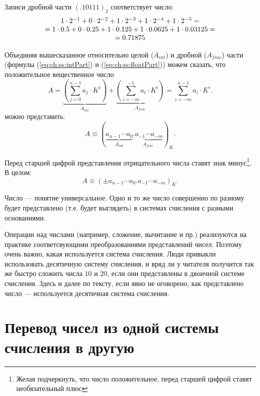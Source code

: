 \begin{exampl}
    Записи дробной части $(.10111)_{2}$  соответствует число:
    \[
        \begin{array}[c]{c}
            1\cdot 2^{-1}+
            0\cdot 2^{-2}+
            1\cdot 2^{-3}+
            1\cdot 2^{-4}+
            1\cdot 2^{-5} = \\
            =
            1\cdot 0.5+
            0\cdot 0.25+
            1\cdot 0.125+
            1\cdot 0.0625+
            1\cdot 0.03125 = \\
            = 0.71875
        \end{array}
    \]
\end{exampl}

Объединяя вышесказанное относительно целой ($A_{int}$) и дробной ($A_{frac}$) части (формулы (\ref{eq:ch:ss:intPart}) и (\ref{eq:ch:ss:floatPart})) можем сказать, что положительное вещественное число 
\[
    A=
    \underbrace{\left(\sum_{j=0}^{n-1}a_j\cdot K^{j}\right)}_{A_{int}} + 
    \underbrace{\left(\sum_{i=-m}^{-1}a_i\cdot K^{i}\right)}_{A_{frac}} =
    \sum_{i=-m}^{n-1}a_i\cdot K^{i}.
\]
можно представить:
\[
    A\equiv(\underbrace{a_{n-1}\cdots a_{0}}_{A_{int}}\underbrace{.a_{-1}\cdots a_{-m}}_{A_{frac}})_K.
\]

Перед старшей цифрой представления отрицательного числа ставят знак минус\footnote{Желая подчеркнуть, что число положительное, перед старшей цифрой ставят необязательный плюс}. В целом:
\[
    A\equiv(\pm a_{n-1}\cdots a_{0}.a_{-1}\cdots a_{-m})_K.
\]

Число --- понятие универсальное. Одно и то же число совершенно по разному будет представлено (т.е. будет выглядеть) в системах счисления с разными основаниями. 

Операции над числами (например, сложение, вычитание и пр.) реализуются на практике соответсвующими преобразованиями представлений чисел. Поэтому очень важно, какая используется система счисления. Люди привыкли использовать десятичную систему счисления, и вряд ли у читателя получится так же быстро сложить числа $10$ и $20$, если они представлены в двоичной системе счисления. Здесь и далее по тексту, если явно не оговорено, как представлено число --- используется десятичная система счисления.


\section{Перевод чисел из одной системы счисления в другую}

